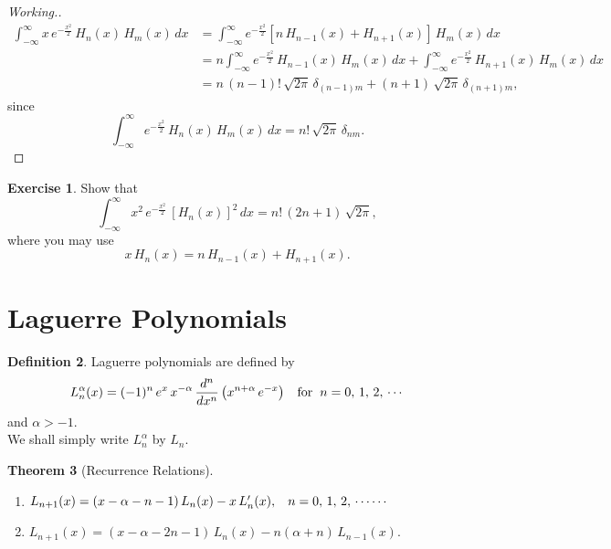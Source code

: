 \documentclass[12pt,a4paper]{report}
\theoremstyle{definition}
\newtheorem{thm}{Theorem}[section]
\newtheorem{defn}[thm]{Definition}
\newtheorem{exe}[thm]{Exercise}
\theoremstyle{plain}
\begin{document}
\begin{proof}[Working.]
\begin{align*}
\int_{-\infty}^{\infty} x\, e^{-\frac{x^2}{2}}\, H_n(x)\, H_m(x)\, dx & =\int_{-\infty}^{\infty}e^{-\frac{x^2}{2}}[n\, H_{n-	1}(x) + H_{n+1}(x)]\, H_m(x)\, dx\\
& = n\int_{-\infty}^{\infty}e^{-\frac{x^2}{2}}\, H_{n-1}(x)\, H_m(x)\, dx + \int_{-\infty}^{\infty} e^{-\frac{x^2}{2}}\, H_{n+	1}(x)\, H_m(x)\, dx\\
& = n\, (n-1)!\, \sqrt{2\pi}\, \delta_{(n-1)m} + (n+1)\, \sqrt{2\pi}\, \delta_{(n+1)m},
\end{align*}
since $$\int_{-\infty}^{\infty} e^{-\frac{x^2}{2}}\, H_n(x)\, H_m(x)\, dx = n!\, \sqrt{2\pi}\, \delta_{nm}.$$
\end{proof}





\begin{exe}
Show that 
$$\int_{-\infty}^{\infty}x^2\, e^{-\frac{x^2}{2}}\, \left[H_n(x)\right]^2\, dx = n!\, (2n+1)\, \sqrt{2\pi},$$ where you may use
$$x\, H_n(x) = n\, H_{n-1}(x) + H_{n+1}(x).$$
\end{exe}







\section{Laguerre Polynomials}
\begin{defn}
Laguerre polynomials are defined by $$L_n^{\alpha}(x) = (-1)^n\,e^x\, x^{-\alpha}\, \frac{d^n}{dx^n}\left(x^{n+\alpha}\, e^{-x}\right)\hspace{0.3cm} \text{for}\hspace{0.2cm} n= 0,\, 1, \, 2,\, \cdots$$ and $\alpha > -1$.\\
We shall simply write $L_n^{\alpha}$ by $L_n$.
\end{defn}



\begin{thm}[Recurrence Relations]\textbf{}
\vspace*{-5mm}
\begin{enumerate}
\item[(a).] $L_{n+1}(x) = (x - \alpha - n - 1)\, L_n(x) - x\, L_n'(x), \hspace{0.3cm} n=0, \, 1, \, 2, \, \cdots\cdots$

\item[(b).] $L_{n+1}(x) = (x-\alpha -2n - 1)\, L_n(x) - n(\alpha +n)\, L_{n-1}(x)$.
\end{enumerate}
\end{thm}
\end{document}
